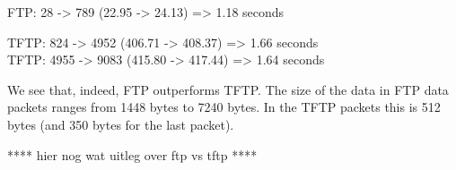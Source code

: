 FTP: 28 -> 789 (22.95 -> 24.13) => 1.18 seconds

TFTP: 824 -> 4952 (406.71 -> 408.37) => 1.66 seconds \\
TFTP: 4955 -> 9083 (415.80 -> 417.44) => 1.64 seconds

We see that, indeed, FTP outperforms TFTP.
The size of the data in FTP data packets ranges from 1448 bytes to 7240 bytes. In the TFTP packets this is 512 bytes (and 350 bytes for the last packet).

**** hier nog wat uitleg over ftp vs tftp ****
